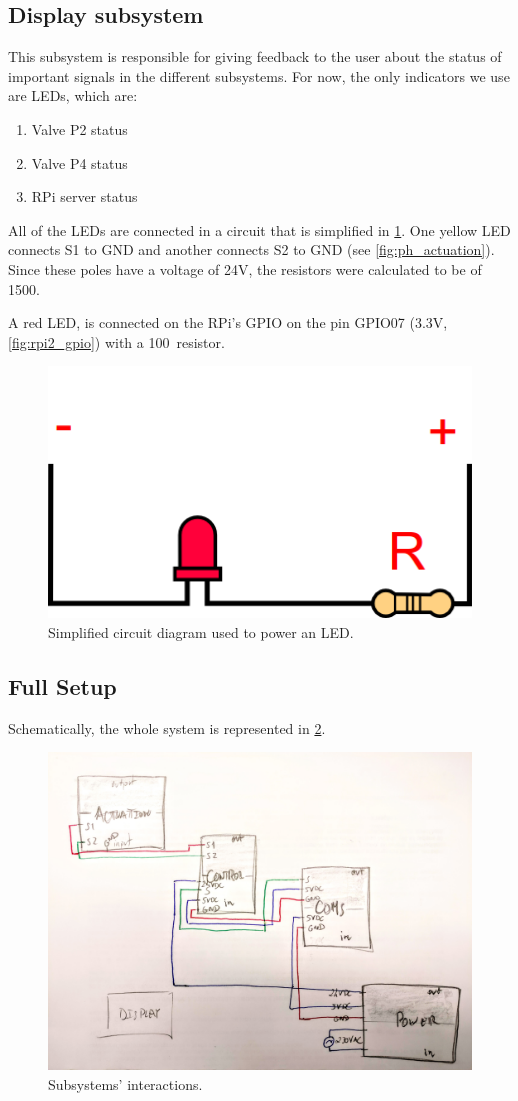 \documentclass[twoside,a4paper]{refart}
\begin{document}
\subsection{Display subsystem}
This subsystem is responsible for giving feedback to the user about the status of important signals in the different subsystems. For now, the only indicators we use are LEDs, which are:
\begin{enumerate}
	\item Valve P2 status
	\item Valve P4 status
	\item RPi server status
\end{enumerate}
All of the LEDs are connected in a circuit that is simplified in \cref{fig:led_circuit}. One yellow LED connects S1 to GND and another connects S2 to GND (see \cref{fig:ph_actuation}). Since these poles have a voltage of 24V, the resistors were calculated to be of 1500\Omega.

A red LED, is connected on the RPi's GPIO on the pin GPIO07 (3.3V, \cref{fig:rpi2_gpio}) with a 100\Omega\ resistor.


\begin{figure}
	\centering
	\includegraphics[width=0.4\linewidth]{led_circuit}
	\caption{Simplified circuit diagram used to power an LED.}
	\label{fig:led_circuit}
\end{figure}


\subsection{Full Setup}
Schematically, the whole system is represented in \cref{fig:subsystem_full}.
\begin{figure}[H]
	\centering
	\includegraphics[width=1.0\linewidth]{subsystems_0}
	\caption{Subsystems' interactions.}
	\label{fig:subsystem_full}
\end{figure}
\end{document}
